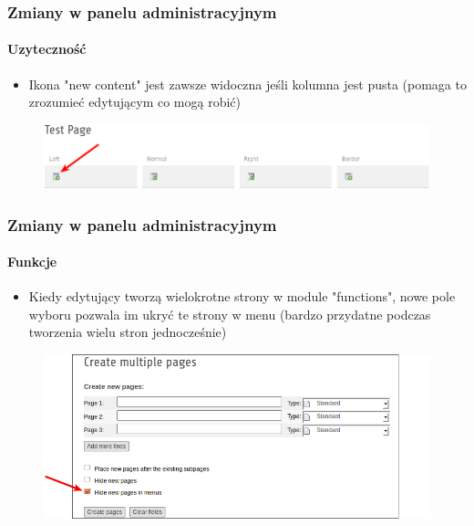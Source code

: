 
\begin{frame}[fragile]
	\frametitle{Zmiany w panelu administracyjnym}
	\framesubtitle{Uzyteczność}

 	\begin{itemize}
		\item Ikona "new content" jest zawsze widoczna jeśli kolumna jest pusta\newline
			\small(pomaga to zrozumieć edytującym co mogą robić)\normalsize
	\end{itemize}

	\begin{figure}
		\includegraphics[width=0.95\linewidth]{Images/BackendChanges/NewContentIconAlwaysVisible.png}
	\end{figure}

\end{frame}


\begin{frame}[fragile]
	\frametitle{Zmiany w panelu administracyjnym}
	\framesubtitle{Funkcje}

 	\begin{itemize}
		\item Kiedy edytujący tworzą wielokrotne strony w module "functions", nowe pole wyboru pozwala im ukryć te strony w menu\newline
			\small(bardzo przydatne podczas tworzenia wielu stron jednocześnie)\normalsize
	\end{itemize}

	\begin{figure}
		\includegraphics[width=0.85\linewidth]{Images/BackendChanges/CreateMultiplePagesHideInMenu.png}
	\end{figure}

\end{frame}

